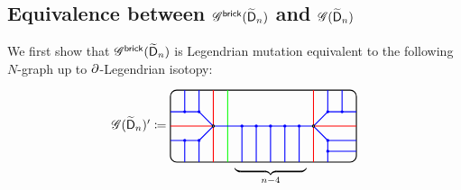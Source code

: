 
\subsection{Equivalence between $\mathscr{G}^{\mathsf{brick}}(\widetilde{\mathsf{D}}_n)$ and $\mathscr{G}(\widetilde{\mathsf{D}}_n)$}\label{appendix:Ngraph of type affine Dn}

We first show that $\mathscr{G}^{\mathsf{brick}}(\widetilde{\mathsf{D}}_n)$ is Legendrian mutation equivalent to the following $N$-graph up to $\partial$-Legendrian isotopy:
\[
\begin{tikzcd}
\ngraph(\exdynD_n)'\coloneqq\begin{tikzpicture}[baseline=-.5ex,scale=0.4]
\draw[rounded corners=5, thick] (-6.5, -2.5) rectangle (6.5, 2.5);
\draw (0.5, -2.5) node[below] {$\underbrace{\hphantom{\hspace{2cm}}}_{n-4}$};
\clip[rounded corners=5] (-6.5, -2.5) rectangle (6.5, 2.5);
\draw[thick, blue, fill]
(-0.5, -2.5) -- (-0.5,0) circle (2pt)
(1.5, -2.5) -- (1.5,0) circle (2pt)
;
\begin{scope}[xscale=-1]
\draw[thick, blue, fill]
(-2.5, -2.5) -- (-2.5,0) circle (2pt)
(-0.5, -2.5) -- (-0.5,0) circle (2pt)
(1.5, -2.5) -- (1.5,0) circle (2pt)
;
\end{scope}
\draw[thick, green, rounded corners] (-2.5, 2.5) -- (-2.5, -2.5);
\draw[thick, red] 
(-3.5, -2.5) -- (-3.5, 2.5)
(-6.5, 0) -- (-3.5, 0)
;
\draw[thick, red] 
(3.5, 2.5) -- (3.5, -2.5)
(6.5, 0) -- (3.5, 0)
;
\draw[thick, blue, fill] 
%
(-3.5, 0) -- (3.5, 0)
(-3.5, 0) -- (-4.5, 1) circle (2pt) -- (-4.5, 2.5)
(-4.5, 1) -- (-6.5, 1)
(-5.5, 1) circle (2pt) -- (-5.5, 2.5)
%
(-3.5, 0) -- (-4.5, -1) circle (2pt) -- (-4.5, -2.5)
(-4.5, -1) -- (-6.5, -1)
(-5.5, -1) circle (2pt) -- (-5.5, -3)
;
\begin{scope}[xscale=-1]
\draw[thick, blue, fill] 
%
(-3.5, 0) -- (-4.5, 1) circle (2pt) -- (-4.5, 2.5)
(-4.5, 1) -- (-6.5, 1)
(-5.5, 1) circle (2pt) -- (-5.5, 2.5)
%
(-3.5, 0) -- (-4.5, -1) circle (2pt) -- (-4.5, -2.5)
(-4.5, -1) -- (-6.5, -1)
(-4.5, -1.75) circle (2pt) -- (-6.5, -1.75)
;
\end{scope}
\draw[thick, fill=white] (-3.5, 0) circle (2pt) (3.5, 0) circle (2pt);

\end{tikzpicture}
\end{tikzcd}\]
